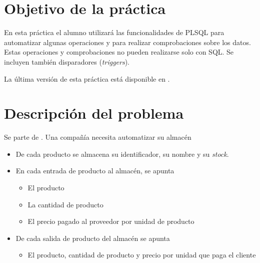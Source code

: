 
\usepackage{needspace}




\renewcommand{\hmwkTitle}{Práctica PLSQL con triggers}
\renewcommand{\hmwkClass}{Gestión de Bases de datos}







\primerapagina


\section{Objetivo de la práctica}
En esta práctica el alumno utilizará las funcionalidades de PLSQL para automatizar algunas operaciones y para realizar comprobaciones sobre los datos. Estas operaciones y comprobaciones no pueden realizarse solo con SQL. Se incluyen también disparadores (\textit{triggers}).

La última versión de esta práctica está disponible en .


\section{Descripción del problema}
Se parte de . Una compañía necesita automatizar su almacén
\begin{itemize}
\item De cada producto se almacena su identificador, su nombre y su \textit{stock}.
\item En cada entrada de producto al almacén, se apunta
  \begin{itemize}
  \item El producto
  \item La cantidad de producto
  \item El precio pagado al proveedor por unidad de producto
  \end{itemize}
\item De cada salida de producto del almacén se apunta
  \begin{itemize}
  \item El producto, cantidad de producto y precio por unidad que paga el cliente
  \end{itemize}
\end{itemize}

